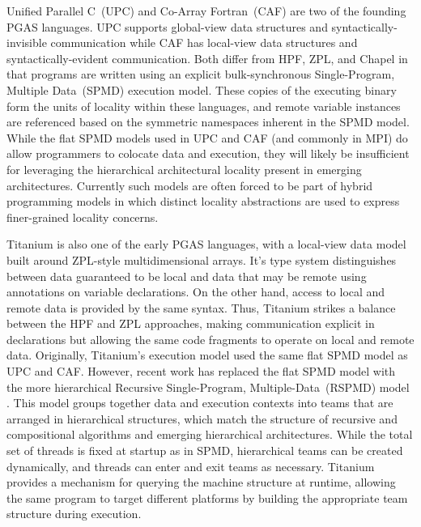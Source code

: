 Unified Parallel C~(UPC) and Co-Array Fortran~(CAF) are two of the
founding PGAS languages.  UPC supports global-view data structures and
syntactically-invisible communication while CAF has local-view data
structures and syntactically-evident communication.  Both differ from
HPF, ZPL, and Chapel in that programs are written using an explicit
bulk-synchronous Single-Program, Multiple Data~(SPMD) execution model.
These copies of the executing binary form the units of locality within
these languages, and remote variable instances are referenced based on
the symmetric namespaces inherent in the SPMD model. While the flat
SPMD models used in UPC and CAF (and commonly in MPI) do allow
programmers to colocate data and execution, they will likely be
insufficient for leveraging the hierarchical architectural locality
present in emerging architectures. Currently such models are often
forced to be part of hybrid programming models in which distinct
locality abstractions are used to express finer-grained locality
concerns.

Titanium \cite{titanium} is also one of the early PGAS languages, with
a local-view data model built around ZPL-style multidimensional
arrays. It's type system distinguishes between data guaranteed to be
local and data that may be remote using annotations on variable
declarations. On the other hand, access to local and remote data is
provided by the same syntax. Thus, Titanium strikes a balance between
the HPF and ZPL approaches, making communication explicit in
declarations but allowing the same code fragments to operate on local
and remote data. Originally, Titanium's execution model used the same
flat SPMD model as UPC and CAF. However, recent work has replaced the
flat SPMD model with the more hierarchical Recursive Single-Program,
Multiple-Data~(RSPMD) model \cite{kamil_lcpc13}. This model groups
together data and execution contexts into teams that are arranged in
hierarchical structures, which match the structure of recursive and
compositional algorithms and emerging hierarchical architectures.
While the total set of threads is fixed at startup as in SPMD,
hierarchical teams can be created dynamically, and threads can enter
and exit teams as necessary. Titanium provides a mechanism for
querying the machine structure at runtime, allowing the same program
to target different platforms by building the appropriate team
structure during execution.

